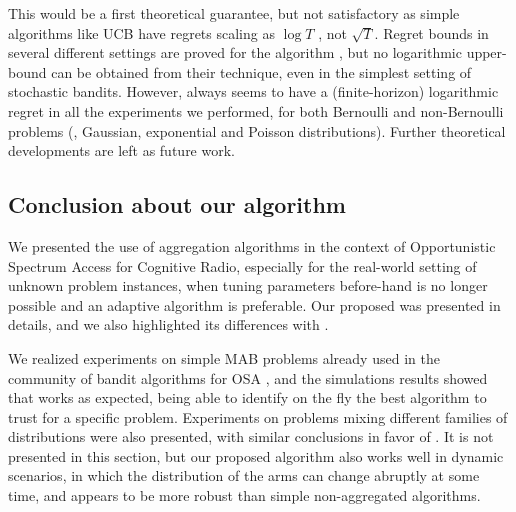This would be a first theoretical guarantee, but not satisfactory as simple algorithms like UCB have regrets scaling as $\log{T}$ \cite{Auer02,Bubeck12}, not $\sqrt{T}$.
%
Regret bounds in several different settings are proved for the \CORRAL{} algorithm \cite{Agarwal16}, but no logarithmic upper-bound can be obtained from their technique, even in the simplest setting of stochastic bandits.
%
However, \Aggr{} always seems to have a (finite-horizon) logarithmic regret in all the experiments we performed,
for both Bernoulli and non-Bernoulli problems (\eg, Gaussian, exponential and Poisson distributions).
Further theoretical developments are left as future work.


\subsection{Conclusion about our \Aggr{} algorithm}\label{sub:25:conclusion}

We presented the use of aggregation algorithms in the context of Opportunistic Spectrum Access for Cognitive Radio,
especially for the real-world setting of unknown problem instances,
when tuning parameters before-hand is no longer possible and an adaptive algorithm is preferable.
Our proposed \Aggr{} was presented in details,
and we also highlighted its differences with \ExpQ.

We realized experiments on simple MAB problems already used in the community of bandit algorithms for OSA \cite{Jouini10},
and the simulations results showed that \Aggr{} works as expected, being able to identify on the fly the best algorithm to trust for a specific problem.
Experiments on problems mixing different families of distributions were also presented, with similar conclusions in favor of \Aggr.
It is not presented in this section, but our proposed algorithm also works well in dynamic scenarios, in which the distribution of the arms can change abruptly at some time,
and appears to be more robust than simple non-aggregated algorithms.

